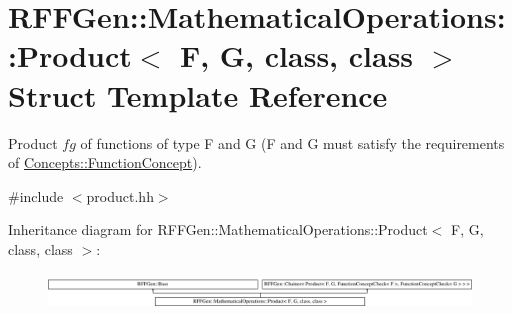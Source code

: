 \hypertarget{structRFFGen_1_1MathematicalOperations_1_1Product}{\section{R\-F\-F\-Gen\-:\-:Mathematical\-Operations\-:\-:Product$<$ F, G, class, class $>$ Struct Template Reference}
\label{structRFFGen_1_1MathematicalOperations_1_1Product}
}


Product $fg$ of functions of type F and G (F and G must satisfy the requirements of \hyperlink{structRFFGen_1_1Concepts_1_1FunctionConcept}{Concepts\-::\-Function\-Concept}).  




{\ttfamily \#include $<$product.\-hh$>$}

Inheritance diagram for R\-F\-F\-Gen\-:\-:Mathematical\-Operations\-:\-:Product$<$ F, G, class, class $>$\-:\begin{figure}[H]
\begin{center}
\leavevmode
\includegraphics[height=0.960549cm]{structRFFGen_1_1MathematicalOperations_1_1Product}
\end{center}
\end{figure}
